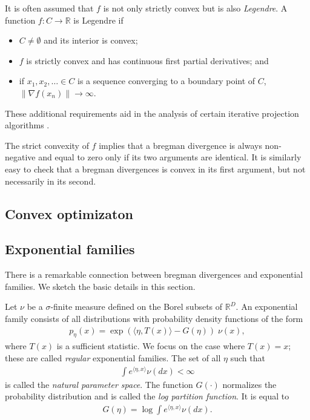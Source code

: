 \documentclass{article}
\newcommand{\R}{\mathbb{R}}
\begin{document}
It is often assumed that $f$ is not only strictly convex but is also
\emph{Legendre}.  A function $f:C\rightarrow \R$ is Legendre if 
\begin{itemize}
\item $C \neq \emptyset$ and its interior is convex;
\item $f$ is strictly convex and has continuous first partial
  derivatives; and
\item if $x_1,x_2,\ldots \in C$ is a sequence converging to a boundary
  point of $C$, $\|\nabla f(x_n) \| \rightarrow \infty$.
\end{itemize}
These additional requirements aid in the analysis of certain iterative
projection algorithms \cite{cz.97}.  

The strict convexity of $f$ implies that a bregman divergence is
always non-negative and equal to zero only if its two arguments are
identical.  It is similarly easy to check that a bregman divergences
is convex in its first argument, but not necessarily in its second.  

\subsection{Convex optimizaton}

\subsection{Exponential families}
There is a remarkable connection between bregman divergences and
exponential families.  We sketch the basic details in this
section.  

Let $\nu$ be a $\sigma$-finite measure defined on the Borel subsets of
$\R^D$.  An  exponential family
consists of all distributions with probability density functions of the form
\begin{align*}
p_{\eta}(x) = \exp(\langle\eta,T(x) \rangle - G(\eta))\;\nu(x),
\end{align*}
where $T(x)$ is a sufficient statistic.  We focus on the case where
$T(x)=x$; these are called \emph{regular} exponential families.  
The set of all $\eta$ such that 
\begin{align*}
\int e^{\langle \eta,x \rangle} \nu(dx) < \infty
\end{align*}
is called the \emph{natural parameter space}.  The function $G(\cdot)$ normalizes
the probability distribution and is called the \emph{log partition
function}.  It is equal to
\begin{align*}
G(\eta) = \log \int e^{\langle \eta,x \rangle } \nu(dx).
\end{align*}
\end{document}
